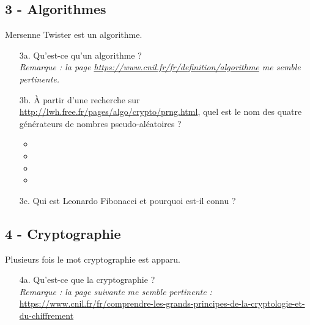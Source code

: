 \subsection*{3 - Algorithmes}

Mersenne Twister est un algorithme. 

\begin{enumerate}
    \item[3a.] Qu’est-ce qu'un algorithme ? \\
    \textit{Remarque : la page \url{https://www.cnil.fr/fr/definition/algorithme} me semble pertinente.}\\
    \Pointilles[8]

    \item[3b.] À partir d'une recherche  sur \url{http://lwh.free.fr/pages/algo/crypto/prng.html}, quel est le nom des quatre générateurs de nombres pseudo-aléatoires ?
    
    \begin{itemize}[label={$\bullet$}]
        \item \dotfill
        \item \dotfill
        \item \dotfill
        \item \dotfill
    \end{itemize} 

    \item[3c.] Qui est Leonardo Fibonacci et pourquoi est-il connu ? \\ \Pointilles[8]
\end{enumerate} 

\subsection*{4 - Cryptographie}

Plusieurs fois le mot cryptographie est apparu. 

\begin{enumerate}
    \item[4a.] Qu'est-ce que la cryptographie ? \\
\textit{Remarque : la page suivante me semble pertinente :} \\
\url{https://www.cnil.fr/fr/comprendre-les-grands-principes-de-la-cryptologie-et-du-chiffrement} \\ \Pointilles[6]
\end{enumerate} 

